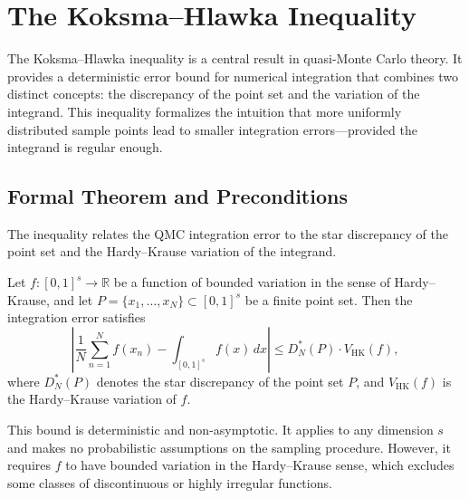 \section{The Koksma--Hlawka Inequality}

The Koksma--Hlawka inequality is a central result in quasi-Monte Carlo theory. It provides a deterministic error bound for numerical integration that combines two distinct concepts: the discrepancy of the point set and the variation of the integrand. This inequality formalizes the intuition that more uniformly distributed sample points lead to smaller integration errors—provided the integrand is regular enough.

\subsection{Formal Theorem and Preconditions}

The inequality relates the QMC integration error to the star discrepancy of the point set and the Hardy--Krause variation of the integrand.

\begin{theorem}
Let $f \colon [0,1]^s \to \mathbb{R}$ be a function of bounded variation in the sense of Hardy--Krause, and let $P = \{x_1, \dots, x_N\} \subset [0,1]^s$ be a finite point set. Then the integration error satisfies
\begin{equation}
    \left| \frac{1}{N} \sum_{n=1}^N f(x_n) - \int_{[0,1]^s} f(x) \, dx \right|
    \leq D_N^{*}(P) \cdot V_{\mathrm{HK}}(f),
\end{equation}
where $D_N^{*}(P)$ denotes the star discrepancy of the point set $P$, and $V_{\mathrm{HK}}(f)$ is the Hardy--Krause variation of $f$.
\end{theorem}

\begin{remark}
This bound is deterministic and non-asymptotic. It applies to any dimension $s$ and makes no probabilistic assumptions on the sampling procedure. However, it requires $f$ to have bounded variation in the Hardy--Krause sense, which excludes some classes of discontinuous or highly irregular functions.
\end{remark}


